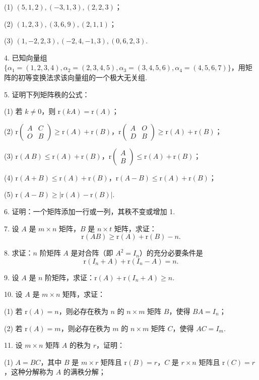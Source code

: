 \documentclass[UTF8, 12pt, fontset=fandol, oneside]{ctexart}
\begin{document}
(1) $(5,1,2),(-3,1,3),(2,2,3)$；

(2) $(1,2,3),(3,6,9),(2,1,1)$；

(3) $(1,-2,2,3),(-2,4,-1,3),(0,6,2,3)$.

4. 已知向量组 $\{\alpha_1=(1,2,3,4),\alpha_2=(2,3,4,5),\alpha_3=(3,4,5,6),\alpha_4=(4,5,6,7)\}$，用矩阵的初等变换法求该向量组的一个极大无关组.

5. 证明下列矩阵秩的公式：

(1) 若 $k\neq 0$，则 $\mathrm{r}(kA)=\mathrm{r}(A)$；

(2) $\mathrm{r}\left(\begin{array}{cc}A&C\\O&B\end{array}\right)\geq \mathrm{r}(A)+\mathrm{r}(B)$，$\mathrm{r}\left(\begin{array}{cc}A&O\\D&B\end{array}\right)\geq \mathrm{r}(A)+\mathrm{r}(B)$；

(3) $\mathrm{r}(A\ B)\leq \mathrm{r}(A)+\mathrm{r}(B)$，$\mathrm{r}\left(\begin{array}{c}A\\B\end{array}\right)\leq \mathrm{r}(A)+\mathrm{r}(B)$；

(4) $\mathrm{r}(A+B)\leq \mathrm{r}(A)+\mathrm{r}(B)$，$\mathrm{r}(A-B)\leq \mathrm{r}(A)+\mathrm{r}(B)$；

(5) $\mathrm{r}(A-B)\geq |\mathrm{r}(A)-\mathrm{r}(B)|$.

6. 证明：一个矩阵添加一行或一列，其秩不变或增加 1.

7. 设 $A$ 是 $m\times n$ 矩阵，$B$ 是 $n\times t$ 矩阵，求证：
\[
\mathrm{r}(AB)\geq \mathrm{r}(A)+\mathrm{r}(B)-n.
\]

8. 求证：$n$ 阶矩阵 $A$ 是对合阵（即 $A^2=I_n$）的充分必要条件是
\[
\mathrm{r}(I_n+A)+\mathrm{r}(I_n-A)=n.
\]

9. 设 $A$ 是 $n$ 阶矩阵，求证：$\mathrm{r}(A)+\mathrm{r}(I_n+A)\geq n$.

10. 设 $A$ 是 $m\times n$ 矩阵，求证：

(1) 若 $\mathrm{r}(A)=n$，则必存在秩为 $n$ 的 $n\times m$ 矩阵 $B$，使得 $BA=I_n$；

(2) 若 $\mathrm{r}(A)=m$，则必存在秩为 $m$ 的 $n\times m$ 矩阵 $C$，使得 $AC=I_m$.

11. 设 $m\times n$ 矩阵 $A$ 的秩为 $r$，证明：

(1) $A=BC$，其中 $B$ 是 $m\times r$ 矩阵且 $\mathrm{r}(B)=r$，$C$ 是 $r\times n$ 矩阵且 $\mathrm{r}(C)=r$，这种分解称为 $A$ 的满秩分解；
\end{document}
